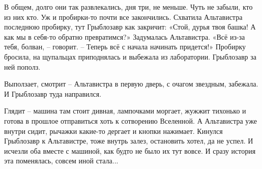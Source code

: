 \documentclass[ebook,oneside,final,openright]{memoir}
\begin{document}
\par
В общем, долго они так развлекались, дня три, не меньше. Чуть не забыли, кто из них кто. Уж и пробирки-то почти все закончились. Схватила Альтавистра последнюю пробирку, тут Грыблозавр как закричит: «Стой, дурья твоя башка! А как мы в себя-то обратно превратимся?» Задумалась Альтавистра. «Всё из-за тебя, болван, – говорит. – Теперь всё с начала начинать придется!» Пробирку бросила, на щупальцах приподнялась и выбежала из лаборатории. Грыблозавр за ней пополз.\par
\par
Выползает, смотрит – Альтавистра в первую дверь, с очагом звездным, забежала. И Грыблозавр туда направился.\par
\par
Глядит – машина там стоит дивная, лампочками моргает, жужжит тихонько и готова в прошлое отправиться хоть к сотворению Вселенной. А Альтавистра уже внутри сидит, рычажки какие-то дергает и кнопки нажимает. Кинулся Грыблозавр к Альтавистре, тоже внутрь залез, остановить хотел, да не успел. И исчезли оба вместе с машиной, как будто не было их тут вовсе. И сразу история эта поменялась, совсем иной стала...\par
\end{document}

